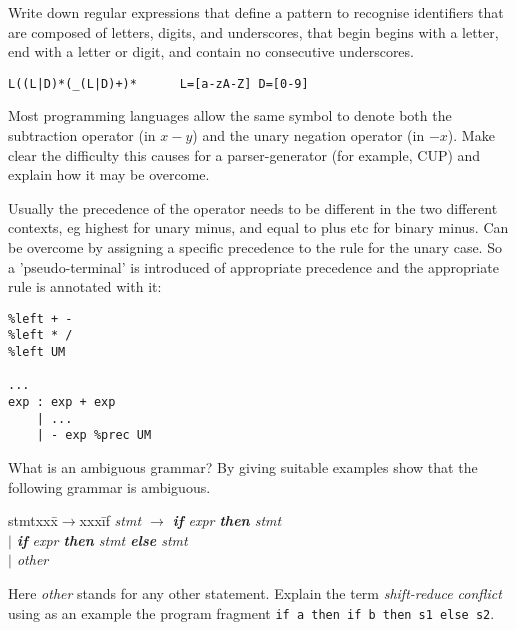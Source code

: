 \documentclass[11pt]{cityexam}
\begin{document}
\begin{questions}

\question

\begin{subquestions}

\subquestion
Write down regular expressions that define a pattern to recognise
identifiers that are composed of letters, digits, and underscores, that begin
begins with a letter, end with a letter or digit, and contain
no consecutive underscores.

\begin{modelanswer}
\begin{verbatim}
L((L|D)*(_(L|D)+)*      L=[a-zA-Z] D=[0-9]
\end{verbatim}
\end{modelanswer}

\subquestion
Most programming languages allow the same symbol to denote both the 
subtraction operator (in $x-y$) and the unary negation operator (in $-x$).
Make clear the difficulty this causes for a parser-generator (for example, CUP)
and explain how it may be overcome.

\begin{modelanswer}
Usually the precedence of the operator needs to be different in 
the two different
contexts, eg highest for unary minus, and equal to plus etc for binary minus.
Can be overcome by assigning 
a specific precedence to the rule for the unary case.
So a 'pseudo-terminal' is introduced of appropriate precedence and the
appropriate rule is annotated with it: 
\begin{verbatim}
%left + - 
%left * /
%left UM

...
exp : exp + exp
    | ...
    | - exp %prec UM
\end{verbatim}
\end{modelanswer}

\subquestion
What is an ambiguous grammar? By giving suitable examples show that the
        following grammar is ambiguous. 
\begin{tabbing}
stmtxxx\=$\rightarrow$xxx\=if\kill
\it
stmt \> $\rightarrow$ \> \textbf{if} {\it expr\/} \textbf{then} {\it stmt} \\
\it
     \> $\mid$ \> \textbf{if} {\it expr\/} \textbf{then} {\it stmt\/} \textbf{else} {\it stmt} \\
     \> $\mid$ \> {\it other}
\end{tabbing}
Here {\it other\/} stands for any other statement.
Explain the term {\em shift-reduce conflict\/} using as
an example the program fragment \verb+if a then if b then s1 else s2+.


\end{subquestions}
\end{questions}
\end{document}
